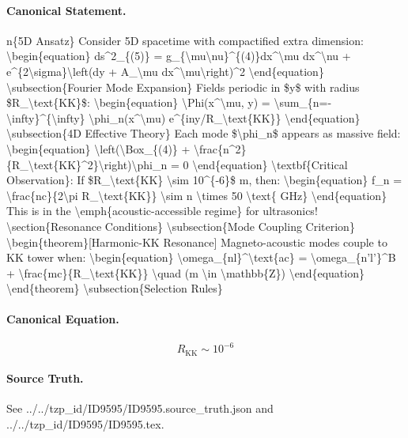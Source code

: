 \paragraph{Canonical Statement.}
n\{5D Ansatz\} Consider 5D spacetime with compactified extra dimension: \textbackslash{}begin\{equation\} ds\textasciicircum{}2\_\{(5)\} = g\_\{\textbackslash{}mu\textbackslash{}nu\}\textasciicircum{}\{(4)\}dx\textasciicircum{}\textbackslash{}mu dx\textasciicircum{}\textbackslash{}nu + e\textasciicircum{}\{2\textbackslash{}sigma\}\textbackslash{}left(dy + A\_\textbackslash{}mu dx\textasciicircum{}\textbackslash{}mu\textbackslash{}right)\textasciicircum{}2 \textbackslash{}end\{equation\} \textbackslash{}subsection\{Fourier Mode Expansion\} Fields periodic in \$y\$ with radius \$R\_\textbackslash{}text\{KK\}\$: \textbackslash{}begin\{equation\} \textbackslash{}Phi(x\textasciicircum{}\textbackslash{}mu, y) = \textbackslash{}sum\_\{n=-\textbackslash{}infty\}\textasciicircum{}\{\textbackslash{}infty\} \textbackslash{}phi\_n(x\textasciicircum{}\textbackslash{}mu) e\textasciicircum{}\{iny/R\_\textbackslash{}text\{KK\}\} \textbackslash{}end\{equation\} \textbackslash{}subsection\{4D Effective Theory\} Each mode \$\textbackslash{}phi\_n\$ appears as massive field: \textbackslash{}begin\{equation\} \textbackslash{}left(\textbackslash{}Box\_\{(4)\} + \textbackslash{}frac\{n\textasciicircum{}2\}\{R\_\textbackslash{}text\{KK\}\textasciicircum{}2\}\textbackslash{}right)\textbackslash{}phi\_n = 0 \textbackslash{}end\{equation\} \textbackslash{}textbf\{Critical Observation\}: If \$R\_\textbackslash{}text\{KK\} \textbackslash{}sim 10\textasciicircum{}\{-6\}\$ m, then: \textbackslash{}begin\{equation\} f\_n = \textbackslash{}frac\{nc\}\{2\textbackslash{}pi R\_\textbackslash{}text\{KK\}\} \textbackslash{}sim n \textbackslash{}times 50 \textbackslash{}text\{ GHz\} \textbackslash{}end\{equation\} This is in the \textbackslash{}emph\{acoustic-accessible regime\} for ultrasonics! \textbackslash{}section\{Resonance Conditions\} \textbackslash{}subsection\{Mode Coupling Criterion\} \textbackslash{}begin\{theorem\}[Harmonic-KK Resonance] Magneto-acoustic modes couple to KK tower when: \textbackslash{}begin\{equation\} \textbackslash{}omega\_\{nl\}\textasciicircum{}\textbackslash{}text\{ac\} = \textbackslash{}omega\_\{n'l'\}\textasciicircum{}B + \textbackslash{}frac\{mc\}\{R\_\textbackslash{}text\{KK\}\} \textbackslash{}quad (m \textbackslash{}in \textbackslash{}mathbb\{Z\}) \textbackslash{}end\{equation\} \textbackslash{}end\{theorem\} \textbackslash{}subsection\{Selection Rules\}

\paragraph{Canonical Equation.}
\[
R_\text{KK} \sim 10^{-6}
\]

\paragraph{Source Truth.}
See ../../tzp\_id/ID9595/ID9595.source\_truth.json and ../../tzp\_id/ID9595/ID9595.tex.
